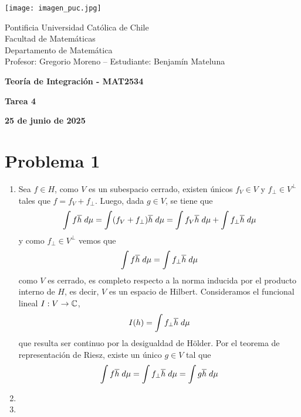 \documentclass{article}
\begin{document}
\begin{minipage}{2.5cm}
    \texttt{[image: imagen\_puc.jpg]}
\end{minipage}
\begin{minipage}{14cm}
    {\sc Pontificia Universidad Católica de Chile\\
    Facultad de Matemáticas\\
    Departamento de Matemática\\
    Profesor: Gregorio Moreno -- Estudiante: Benjamín Mateluna}
\end{minipage}
\vspace{1ex}

{\centerline{\bf Teoría de Integración - MAT2534}
\centerline{\bf Tarea 4}}
\centerline{\bf 25 de junio de 2025}

\section*{Problema 1}
\begin{enumerate}
    \item Sea $f\in H$, como $V$ es un subespacio cerrado, existen únicos $f_{V}\in V$ y 
    $f_{\perp}\in V^{\perp}$ tales que $f=f_{V}+f_{\perp}$. Luego, dada $g\in V$, se tiene que
    \begin{equation*}
        \int f\overline{h}\hspace{1mm}d\mu=\int (f_{V}+f_{\perp})\overline{h}\hspace{1mm}d\mu
        =\int f_{V}\overline{h}\hspace{1mm}d\mu+\int f_{\perp}\overline{h}\hspace{1mm}d\mu
    \end{equation*}
    y como $f_{\perp}\in V^{\perp}$ vemos que
    \begin{equation*}
        \int f\overline{h}\hspace{1mm}d\mu=\int f_{\perp}\overline{h}\hspace{1mm}d\mu
    \end{equation*}
    como $V$ es cerrado, es completo respecto a la norma inducida por el producto interno de $H$, 
    es decir, $V$ es un espacio de Hilbert. Consideramos el funcional lineal $I:V\to\mathbb{C}$,
    \begin{equation*}
        I(h)=\int f_{\perp}\overline{h}\hspace{1mm}d\mu
    \end{equation*}
    que resulta ser continuo por la desigualdad de Hölder. Por el teorema de representación de
    Riesz, existe un único $g\in V$ tal que
    \begin{equation*}
        \int f\overline{h}\hspace{1mm}d\mu=\int f_{\perp}\overline{h}\hspace{1mm}d\mu
        =\int g\overline{h}\hspace{1mm}d\mu
    \end{equation*}

    \item 
    \item 
\end{enumerate}
\end{document}
